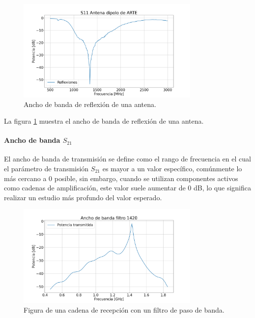 \begin{figure}
    \centering
    \includegraphics[width = 0.8\textwidth]{img/s11Arte}
    \caption{Ancho de banda de reflexión de una antena.}
    \label{fig:bandwidth}
\end{figure}

La figura \ref{fig:bandwidth} muestra el ancho de banda de reflexión de una antena.\\

\paragraph{Ancho de banda $S_{21}$} El ancho de banda de transmisión se define como el rango de frecuencia en el cual el parámetro de transmisión $S_{21}$ es mayor a un valor específico, comúnmente lo más cercano a 0 posible, sin embargo, cuando se utilizan componentes activos como cadenas de amplificación, este valor suele aumentar de 0 dB, lo que significa realizar un estudio más profundo del valor esperado.\\

\begin{figure}
    \centering
    \includegraphics[width = 0.8\textwidth]{img/s21Fh1}
    \caption{Figura de una cadena de recepción con un filtro de paso de banda.}
    \label{fig:bandwidth2}
\end{figure}

